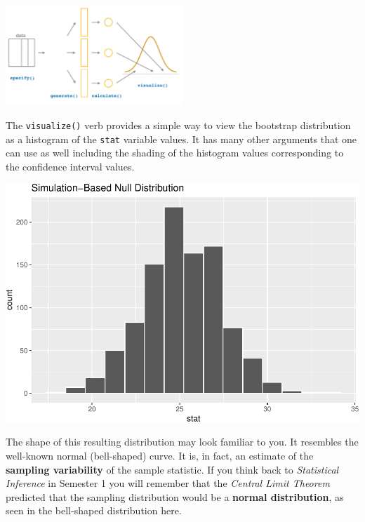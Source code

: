 \documentclass[]{article}
\newenvironment{Shaded}{\begin{snugshade}}{\end{snugshade}}
\newcommand{\KeywordTok}[1]{\textcolor[rgb]{0.13,0.29,0.53}{\textbf{#1}}}
\newcommand{\StringTok}[1]{\textcolor[rgb]{0.31,0.60,0.02}{#1}}
\newcommand{\OperatorTok}[1]{\textcolor[rgb]{0.81,0.36,0.00}{\textbf{#1}}}
\newcommand{\NormalTok}[1]{#1}
\begin{document}
\begin{center}
\includegraphics[width=0.5\textwidth]{visualize.png}
\end{center}

The \texttt{visualize()} verb provides a simple way to view the
bootstrap distribution as a histogram of the \texttt{stat} variable
values. It has many other arguments that one can use as well including
the shading of the histogram values corresponding to the confidence
interval values.

\begin{Shaded}
\end{Shaded}

\includegraphics{DAWeek7_files/figure-latex/visualize-1.pdf}

The shape of this resulting distribution may look familiar to you. It
resembles the well-known normal (bell-shaped) curve. It is, in fact, an
estimate of the \textbf{sampling variability} of the sample statistic.
If you think back to \emph{Statistical Inference} in Semester 1 you will
remember that the \emph{Central Limit Theorem} predicted that the
sampling distribution would be a \textbf{normal distribution}, as seen
in the bell-shaped distribution here.
\end{document}
